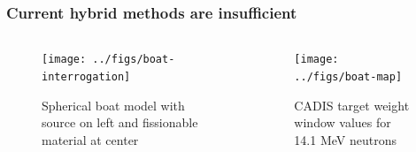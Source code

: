 \documentclass[xcolor=x11names,compress]{beamer}
\renewcommand{\(}{\begin{columns}}
\renewcommand{\)}{\end{columns}}
\newcommand{\<}[1]{\begin{column}{#1}}
\renewcommand{\>}{\end{column}}
\begin{document}
\begin{frame}[fragile]
  \frametitle{Current hybrid methods are insufficient}

	\begin{columns}
  	\begin{column}{0.5\textwidth}
 	 \begin{center}
 	 \begin{figure}
 	 \texttt{[image: ../figs/boat-interrogation]}  
 	 \caption{Spherical boat model with source on left and fissionable material at center}
 	 \end{figure}
 	 \end{center}
  	\end{column}
 	\begin{column}{0.5\textwidth}
 	 \begin{center}
 	 \begin{figure}
 	 \texttt{[image: ../figs/boat-map]}  
 	 \caption{CADIS target weight window values for 14.1 MeV neutrons}
 	 \end{figure}
 	 \end{center}
  	\end{column}
	\end{columns}




\end{frame}
\end{document}
